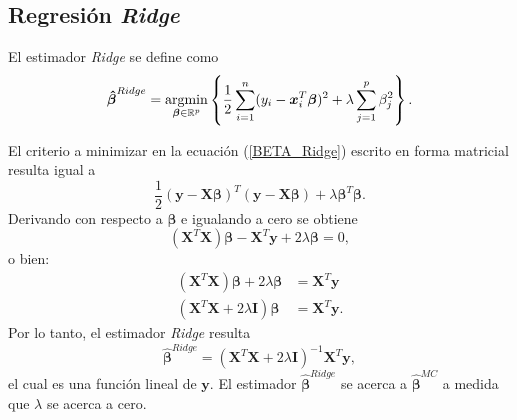 \documentclass[a4paper,12pt]{report}
\begin{document}
\subsection{Regresión \textit{Ridge}}
El estimador \textit{Ridge} se define como
\begin{equation}
\label{BETA_Ridge}
\boldsymbol{\hat{\beta}}^{Ridge}=\operatornamewithlimits{argmin}\limits_{\boldsymbol{\beta} \in \mathbb{R}^p} \left\{ \frac{1}{2} \sum_{i=1}^n (y_i-\boldsymbol{x}_i^T\boldsymbol{\beta})^2+\lambda \sum_{j=1}^p \beta_j^2 \right\}.
\end{equation}

El criterio a minimizar en la ecuación (\ref{BETA_Ridge}) escrito en forma matricial resulta igual a
\begin{equation}
\dfrac{1}{2}(\boldsymbol{y}-\boldsymbol{X}\boldsymbol{\beta})^T(\boldsymbol{y}-\boldsymbol{X}\boldsymbol{\beta})+\lambda \boldsymbol{\beta}^T\boldsymbol{\beta}.
\end{equation}
Derivando con respecto a $\boldsymbol{\beta}$ e igualando a cero se obtiene
\begin{equation}
(\boldsymbol{X}^T\boldsymbol{X})\boldsymbol{\beta}-\boldsymbol{X}^T\boldsymbol{y}+2\lambda\boldsymbol{\beta}=0,
\end{equation}
o bien:
\begin{align}
(\boldsymbol{X}^T\boldsymbol{X})\boldsymbol{\beta}+2\lambda\boldsymbol{\beta}&=\boldsymbol{X}^T\boldsymbol{y} \\
(\boldsymbol{X}^T\boldsymbol{X}+2\lambda \boldsymbol{I})\boldsymbol{\beta}&=\boldsymbol{X}^T\boldsymbol{y}.
\end{align}
Por lo tanto, el estimador \textit{Ridge} resulta
\begin{equation}
\label{RIDGE_ESTIMATOR}
\boldsymbol{\hat{\beta}}^{Ridge}=(\boldsymbol{X}^T\boldsymbol{X}+2\lambda \boldsymbol{I})^{-1}\boldsymbol{X}^T\boldsymbol{y},
\end{equation}
el cual es una función lineal de $\boldsymbol{y}$. El estimador $\boldsymbol{\hat{\beta}}^{Ridge}$ se acerca a $\boldsymbol{\hat{\beta}}^{MC}$ a medida que $\lambda$ se acerca a cero.
\end{document}
